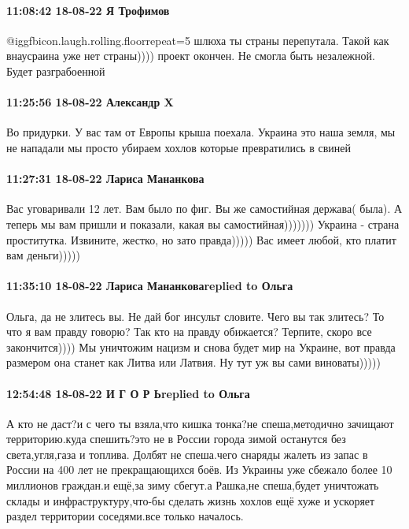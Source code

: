 \paragraph{11:08:42 18-08-22 Я Трофимов}

 @igg{fbicon.laugh.rolling.floor}{repeat=5} шлюха ты страны перепутала. Такой как внаусраина уже нет страны))))
проект окончен. Не смогла быть незалежной. Будет разграбоенной

\paragraph{11:25:56 18-08-22 Александр X}

Во придурки. У вас там от Европы крыша поехала. Украина это наша земля, мы не
нападали мы просто убираем хохлов которые превратились в свиней

\paragraph{11:27:31 18-08-22 Лариса Мананкова}

Вас уговаривали 12 лет. Вам было по фиг. Вы же самостийная держава( была). А
теперь мы вам пришли и показали, какая вы самостийная))))))) Украина - страна
проститутка. Извините, жестко, но зато правда))))) Вас имеет любой, кто платит
вам деньги)))))

\paragraph{11:35:10 18-08-22 Лариса Мананковаreplied to Ольга}

Ольга, да не злитесь вы. Не дай бог инсульт словите. Чего вы так злитесь? То
что я вам правду говорю? Так кто на правду обижается? Терпите, скоро все
закончится)))) Мы уничтожим нацизм и снова будет мир на Украине, вот правда
размером она станет как Литва или Латвия. Ну тут уж вы сами виноваты)))))

\paragraph{12:54:48 18-08-22 И Г О Р Ьreplied to Ольга}

А кто не даст?и с чего ты взяла,что кишка тонка?не спеша,методично зачищают
территорию.куда спешить?это не в России города зимой останутся без
света,угля,газа и топлива. Долбят не спеша.чего снаряды жалеть из запас в
России на 400 лет не прекращающихся боёв. Из Украины уже сбежало более 10
миллионов граждан.и ещё,за зиму сбегут.а Рашка,не спеша,будет уничтожать склады
и инфраструктуру,что-бы сделать жизнь хохлов ещё хуже и ускоряет раздел
территории соседями.все только началось.

